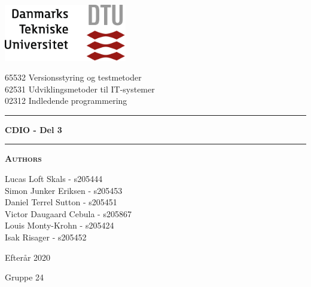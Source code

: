 \begin{titlepage}
\begin{center}
\vspace{2cm}
\includegraphics[width=0.4\textwidth]{root/dtu.png}~\\[1cm]
\vspace{0.2cm}

65532 Versionsstyring og testmetoder \\
62531 Udviklingsmetoder til IT-systemer \\
02312 Indledende programmering \\

\vspace{1cm}

\hrule
\vspace{.5cm}
{ \huge \bfseries  CDIO - Del 3} %
\vspace{.5cm}

\hrule
\vspace{1.5cm}

\textsc{\textbf{Authors}}\\
\vspace{.5cm}


Lucas Loft Skals - s205444\\
Simon Junker Eriksen - s205453\\
Daniel Terrel Sutton - s205451\\
Victor Daugaard Cebula - s205867\\
Louis Monty-Krohn - s205424\\
Isak Risager - s205452\\

\vspace{2cm}

Efterår 2020

\vspace{0.5cm}

Gruppe 24

\end{center}
\end{titlepage}